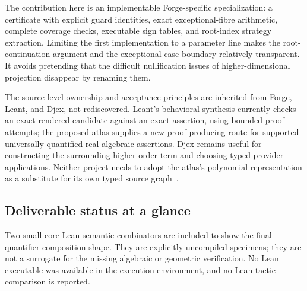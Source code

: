 The contribution here is an implementable Forge-specific specialization: a certificate with explicit guard identities, exact exceptional-fibre arithmetic, complete coverage checks, executable sign tables, and root-index strategy extraction. Limiting the first implementation to a parameter line makes the root-continuation argument and the exceptional-case boundary relatively transparent. It avoids pretending that the difficult nullification issues of higher-dimensional projection disappear by renaming them.

The source-level ownership and acceptance principles are inherited from Forge, Leant, and Djex, not rediscovered. Leant's behavioral synthesis currently checks an exact rendered candidate against an exact assertion, using bounded proof attempts; the proposed atlas supplies a new proof-producing route for supported universally quantified real-algebraic assertions. Djex remains useful for constructing the surrounding higher-order term and choosing typed provider applications. Neither project needs to adopt the atlas's polynomial representation as a substitute for its own typed source graph~\cite{forge-neighbors,leant-behavior,djex}.

\subsection{Deliverable status at a glance}
Two small core-Lean semantic combinators are included to show the final quantifier-composition shape. They are explicitly uncompiled specimens; they are not a surrogate for the missing algebraic or geometric verification. No Lean executable was available in the execution environment, and no Lean tactic comparison is reported.
